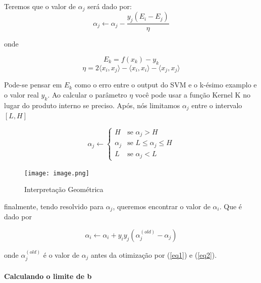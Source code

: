 \documentclass{article}
\begin{document}
Teremos que o valor de \(\alpha_j\) será dado por:
\begin{equation}\label{eq1}
    \alpha_j\gets\alpha_j-\frac{y_j(E_i-E_j)}{\eta}
\end{equation}

onde

\begin{equation}\label{eq4}
E_k = f(x_k)-y_k 
\end{equation}
\begin{equation}\label{eq3}
    \eta = 2\langle x_i,x_j\rangle-\langle x_i,x_i\rangle-\langle x_j,x_j\rangle
\end{equation}

Pode-se pensar em \(E_k\) como o erro entre o output do SVM e o k-ésimo examplo e o valor real \(y_k\). Ao calcular o parâmetro \(\eta\) você pode usar a função Kernel K no lugar do produto interno se preciso. Após, nós limitamos \(\alpha_j\) entre o intervalo \([L,H]\)

\begin{equation}\label{eq2}
    \alpha_j \gets\begin{cases}
    H &\text{se } \alpha_j>H\\
    \alpha_j &\text{se } L\leq\alpha_j\leq H\\
    L &\text{se } \alpha_j<L
\end{cases}\end{equation}

\begin{figure}[H]
        \centering
        \texttt{[image: image.png]}
        \caption{Interpretação Geométrica}
        \label{fig:enter-label}
\end{figure}



finalmente, tendo resolvido para \(\alpha_j\), queremos encontrar o valor de \(\alpha_i\). Que é dado por

\begin{equation}\label{alpha}\alpha_i\gets\alpha_i+y_i y_j(\alpha_{j}^{(old)}-\alpha_j)\end{equation}

onde \(\alpha_{j}^{(old)}\) é o valor de \(\alpha_j\) antes da otimização por (\ref{eq1}) e (\ref{eq2}).

\paragraph{Calculando o limite de b} \hspace{0pt}\\
\end{document}
